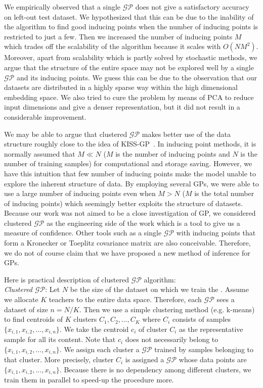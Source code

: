 We empirically observed that a single $\mathcal{GP}$ does not give a satisfactory accuracy on left-out test dataset. We hypothesized that this can be due to the inability of the algorithm to find good inducing points when the number of inducing points is restricted to just a few.
Then we increased the number of inducing points $M$ which trades off the scalability of the algorithm because it scales with $O(NM^2)$. Moreover, apart from scalability which is partly solved by stochastic methods, we argue that the structure of the entire space may not be explored well by a single $\mathcal{GP}$ and its inducing points.
We guess this can be due to the observation that our datasets are distributed in a highly sparse way within the high dimensional embedding space. 
We also tried to cure the problem by means of PCA to reduce input dimensions and give a denser representation, but it did not result in a considerable improvement\citep{dehghani:2018:ICLR}. 
%

We may be able to argue that clustered $\mathcal{GP}$ makes better use of the data structure roughly close to the idea of KISS-GP~\citep{Wilson:2015:KIS:3045118.3045307}.
In inducing point methods, it is normally assumed that $M\ll N$ ($M$ is the number of inducing points and $N$ is the number of training samples) for computational and storage saving. However, we have this intuition that few number of inducing points make the model unable to explore the inherent structure of data. By employing several GPs, we were able to use a large number of inducing points even when $M>N$ ($M$ is the total number of inducing points) which seemingly better exploits the structure of datasets. Because our work was not aimed to be a close investigation of GP, we considered clustered $\mathcal{GP}$ as the engineering side of the work which is a tool to give us a measure of confidence. Other tools such as a single $\mathcal{GP}$ with inducing points that form a Kronecker or Toeplitz covariance matrix are also conceivable. Therefore, we do not of course claim that we have proposed a new method of inference for GPs. 

Here is practical description of clustered $\mathcal{GP}$ algorithm:\\
{\it Clustered $\mathcal{GP}$}: Let $N$ be the size of the dataset on which we train the \tch. Assume we allocate $K$ teachers to the entire data space. Therefore, each $\mathcal{GP}$ sees a dataset of size $n=N/K$.
Then we use a simple clustering method (e.g. k-means) to find centroids of $K$ clusters $C_1, C_2, \ldots, C_K$ where $C_i$ consists of samples $\{x_{i,1}, x_{i,2},\ldots,x_{i,n}\}$. We take the centroid $c_i$ of cluster $C_i$ as the representative sample for all its content. Note that $c_i$ does not necessarily belong to $\{x_{i,1}, x_{i,2},...,x_{i,n}\}$. We assign each cluster a $\mathcal{GP}$ trained by samples belonging to that cluster. More precisely, cluster $C_i$ is assigned a $\mathcal{GP}$ whose data points are $\{x_{i,1}, x_{i,2},...,x_{i,n}\}$.
Because there is no dependency among different clusters, we train them in parallel to speed-up the procedure more. 

